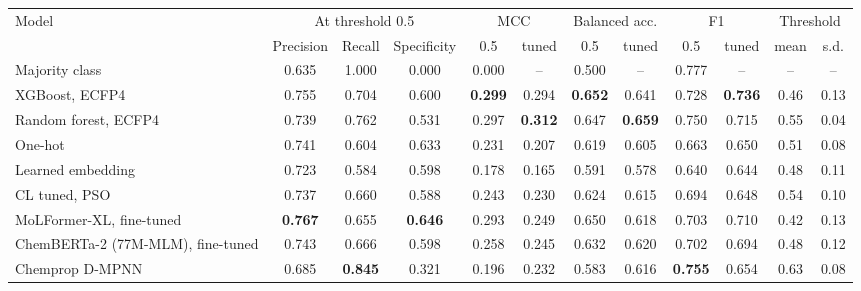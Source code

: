 \begin{tabular}{lccccccccccc}
\toprule
Model & \multicolumn{3}{c}{At threshold 0.5} & \multicolumn{2}{c}{MCC} & \multicolumn{2}{c}{Balanced acc.} & \multicolumn{2}{c}{F1} & \multicolumn{2}{c}{Threshold} \\
\cmidrule(lr){2-4}\cmidrule(lr){5-6}\cmidrule(lr){7-8}\cmidrule(lr){9-10}\cmidrule(lr){11-12}
 & Precision & Recall & Specificity & 0.5 & tuned & 0.5 & tuned & 0.5 & tuned & mean & s.d. \\
\midrule
Majority class & 0.635 & 1.000 & 0.000 & 0.000 & -- & 0.500 & -- & 0.777 & -- & -- & -- \\
XGBoost, ECFP4 & 0.755 & 0.704 & 0.600 & \textbf{0.299} & 0.294 & \textbf{0.652} & 0.641 & 0.728 & \textbf{0.736} & 0.46 & 0.13 \\
Random forest, ECFP4 & 0.739 & 0.762 & 0.531 & 0.297 & \textbf{0.312} & 0.647 & \textbf{0.659} & 0.750 & 0.715 & 0.55 & 0.04 \\
One-hot & 0.741 & 0.604 & 0.633 & 0.231 & 0.207 & 0.619 & 0.605 & 0.663 & 0.650 & 0.51 & 0.08 \\
Learned embedding & 0.723 & 0.584 & 0.598 & 0.178 & 0.165 & 0.591 & 0.578 & 0.640 & 0.644 & 0.48 & 0.11 \\
CL tuned, PSO & 0.737 & 0.660 & 0.588 & 0.243 & 0.230 & 0.624 & 0.615 & 0.694 & 0.648 & 0.54 & 0.10 \\
MoLFormer-XL, fine-tuned & \textbf{0.767} & 0.655 & \textbf{0.646} & 0.293 & 0.249 & 0.650 & 0.618 & 0.703 & 0.710 & 0.42 & 0.13 \\
ChemBERTa-2 (77M-MLM), fine-tuned & 0.743 & 0.666 & 0.598 & 0.258 & 0.245 & 0.632 & 0.620 & 0.702 & 0.694 & 0.48 & 0.12 \\
Chemprop D-MPNN & 0.685 & \textbf{0.845} & 0.321 & 0.196 & 0.232 & 0.583 & 0.616 & \textbf{0.755} & 0.654 & 0.63 & 0.08 \\
\bottomrule
\end{tabular}